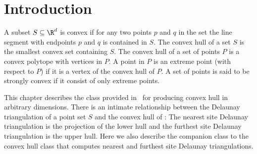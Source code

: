\section{Introduction}

A subset $S \subseteq \R^d$ is convex if for any two points $p$ and $q$
in the set the line segment with endpoints $p$ and $q$ is contained
in $S$. The convex hull of a set $S$
is the smallest convex set containing
$S$. The convex hull of a set of points $P$ is a convex
polytope with vertices in $P$. A point in $P$ is an extreme point
(with respect to $P$) if it is a vertex of
the convex hull of $P$.  A set of points is said to be strongly convex %
 if it consist of only extreme points.

This chapter describes the class provided in \cgal\ for producing convex 
hull in arbitrary dimensions. There is an intimate relationship between 
the Delaunay triangulation of a point set $S$ and the convex hull of 
: The nearest site
Delaunay triangulation is the projection of the lower hull and the
furthest site Delaunay triangulation is the upper hull.  Here we also 
describe the companion class to the convex hull class that computes 
nearest and furthest site Delaunay triangulations.

